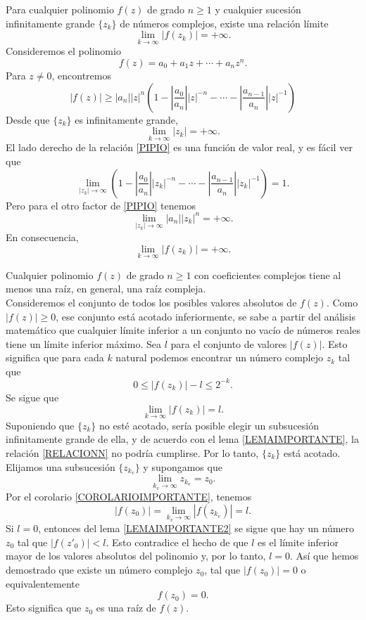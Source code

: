 \begin{lemma}\label{LEMAIMPORTANTE}
    Para cualquier polinomio $f(z)$ de grado $n \geq 1$ y cualquier sucesión infinitamente grande $\{z_k\}$ de números complejos, existe una relación límite
    $$\lim_{k \rightarrow \infty} |f(z_k)| = + \infty.$$
    \demostracion Consideremos el polinomio
    $$f(z)=a_0+a_1z+ \cdots + a_nz^n.$$
    Para $z \neq 0$, encontremos
    \begin{equation}
        |f(z)| \geq |a_n||z|^n \left( 1- \left| \frac{a_0}{a_n} \right| |z|^{-n}- \cdots - \left| \frac{a_{n-1}}{a_n} \right| |z|^{-1} \right) \label{PIPIO}
    \end{equation}
    Desde que $\{z_k\}$ es infinitamente grande,
    $$\lim_{k \rightarrow \infty} |z_k|=+\infty.$$
    El lado derecho de la relación \eqref{PIPIO} es una función de valor real, y es fácil ver que
    $$\lim_{|z_k| \rightarrow \infty} \left( 1- \left| \frac{a_0}{a_n} \right| |z_k|^{-n}- \cdots - \left| \frac{a_{n-1}}{a_n} \right| |z_k|^{-1} \right) =1.$$
    Pero para el otro factor de \eqref{PIPIO} tenemos
    $$\lim_{|z_k| \rightarrow \infty} |a_n| |z_k|^n=+\infty.$$
    En consecuencia,
    $$\lim_{k \rightarrow \infty} |f(z_k)| = + \infty.$$
\end{lemma}

\begin{theorem}
    Cualquier polinomio $f(z)$ de grado $n \geq 1$ con coeficientes complejos tiene al menos una raíz, en general, una raíz compleja. \\
    \demostracion Consideremos el conjunto de todos los posibles valores absolutos de $f(z)$. Como $|f(z)| \geq 0$, ese conjunto está acotado inferiormente, se sabe a partir del análisis matemático que cualquier límite inferior a un conjunto no vacío de números reales tiene un límite inferior máximo. Sea $l$ para el conjunto de valores $|f(z)|$. Esto significa que para cada $k$ natural podemos encontrar un número complejo $z_k$ tal que
    $$0 \leq |f(z_k)| - l \leq 2^{-k}.$$
    Se sigue que
    \begin{equation}
        \lim_{k \rightarrow \infty} |f(z_k)|=l. \label{RELACIONN}
    \end{equation}
    Suponiendo que $\{z_k\}$ no esté acotado, sería posible elegir un subsucesión infinitamente grande de ella, y de acuerdo con el lema \ref{LEMAIMPORTANTE}, la relación \eqref{RELACIONN} no podría cumplirse. Por lo tanto, $\{z_k\}$ está acotado. Elijamos una subsucesión $\{z_{k_v}\}$ y supongamos que
    $$\lim_{k_v \rightarrow \infty} z_{k_v} = z_0.$$
    Por el corolario \ref{COROLARIOIMPORTANTE}, tenemos
    $$|f(z_0)| = \lim_{k_v \rightarrow \infty} |f(z_{k_v})|=l.$$
    Si $l=0$, entonces del lema \ref{LEMAIMPORTANTE2} se sigue que hay un número $z_0$ tal que $|f(z'_0)|<l$. Esto contradice el hecho de que $l$ es el límite inferior mayor de los valores absolutos del polinomio y, por lo tanto, $l=0$. Así que hemos demostrado que existe un número complejo $z_0$, tal que $|f(z_0)|=0$ o equivalentemente
    $$f(z_0)=0.$$
    Esto significa que $z_0$ es una raíz de $f(z)$.
\end{theorem}

